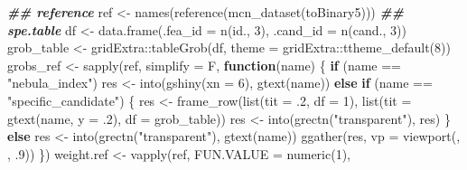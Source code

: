\documentclass[
]{article}
\newenvironment{Shaded}{\begin{snugshade}}{\end{snugshade}}
\newcommand{\AttributeTok}[1]{\textcolor[rgb]{0.77,0.63,0.00}{#1}}
\newcommand{\ControlFlowTok}[1]{\textcolor[rgb]{0.13,0.29,0.53}{\textbf{#1}}}
\newcommand{\DecValTok}[1]{\textcolor[rgb]{0.00,0.00,0.81}{#1}}
\newcommand{\DocumentationTok}[1]{\textcolor[rgb]{0.56,0.35,0.01}{\textbf{\textit{#1}}}}
\newcommand{\FunctionTok}[1]{\textcolor[rgb]{0.00,0.00,0.00}{#1}}
\newcommand{\NormalTok}[1]{#1}
\newcommand{\OtherTok}[1]{\textcolor[rgb]{0.56,0.35,0.01}{#1}}
\newcommand{\SpecialCharTok}[1]{\textcolor[rgb]{0.00,0.00,0.00}{#1}}
\newcommand{\StringTok}[1]{\textcolor[rgb]{0.31,0.60,0.02}{#1}}
\begin{document}
\begin{Shaded}
\begin{Highlighting}[]
\DocumentationTok{\#\# reference}
\NormalTok{ref }\OtherTok{\textless{}{-}} \FunctionTok{names}\NormalTok{(}\FunctionTok{reference}\NormalTok{(}\FunctionTok{mcn\_dataset}\NormalTok{(toBinary5)))}
\DocumentationTok{\#\# spe.table}
\NormalTok{df }\OtherTok{\textless{}{-}} \FunctionTok{data.frame}\NormalTok{(}\AttributeTok{.fea\_id =} \FunctionTok{n}\NormalTok{(id., }\DecValTok{3}\NormalTok{), }\AttributeTok{.cand\_id =} \FunctionTok{n}\NormalTok{(cand., }\DecValTok{3}\NormalTok{))}
\NormalTok{grob\_table }\OtherTok{\textless{}{-}}\NormalTok{ gridExtra}\SpecialCharTok{::}\FunctionTok{tableGrob}\NormalTok{(df, }\AttributeTok{theme =}\NormalTok{ gridExtra}\SpecialCharTok{::}\FunctionTok{ttheme\_default}\NormalTok{(}\DecValTok{8}\NormalTok{))}
\NormalTok{grobs\_ref }\OtherTok{\textless{}{-}} \FunctionTok{sapply}\NormalTok{(ref, }\AttributeTok{simplify =}\NormalTok{ F,}
                    \ControlFlowTok{function}\NormalTok{(name) \{}
                      \ControlFlowTok{if}\NormalTok{ (name }\SpecialCharTok{==} \StringTok{"nebula\_index"}\NormalTok{)}
\NormalTok{                        res }\OtherTok{\textless{}{-}} \FunctionTok{into}\NormalTok{(}\FunctionTok{gshiny}\NormalTok{(}\AttributeTok{xn =} \DecValTok{6}\NormalTok{), }\FunctionTok{gtext}\NormalTok{(name))}
                      \ControlFlowTok{else} \ControlFlowTok{if}\NormalTok{ (name }\SpecialCharTok{==} \StringTok{"specific\_candidate"}\NormalTok{) \{}
\NormalTok{                        res }\OtherTok{\textless{}{-}} \FunctionTok{frame\_row}\NormalTok{(}\FunctionTok{list}\NormalTok{(}\AttributeTok{tit =}\NormalTok{ .}\DecValTok{2}\NormalTok{, }\AttributeTok{df =} \DecValTok{1}\NormalTok{),}
                                         \FunctionTok{list}\NormalTok{(}\AttributeTok{tit =} \FunctionTok{gtext}\NormalTok{(name, }\AttributeTok{y =}\NormalTok{ .}\DecValTok{2}\NormalTok{), }\AttributeTok{df =}\NormalTok{ grob\_table))}
\NormalTok{                        res }\OtherTok{\textless{}{-}} \FunctionTok{into}\NormalTok{(}\FunctionTok{grectn}\NormalTok{(}\StringTok{"transparent"}\NormalTok{), res)}
\NormalTok{                      \} }\ControlFlowTok{else}
\NormalTok{                        res }\OtherTok{\textless{}{-}} \FunctionTok{into}\NormalTok{(}\FunctionTok{grectn}\NormalTok{(}\StringTok{"transparent"}\NormalTok{), }\FunctionTok{gtext}\NormalTok{(name))}
                      \FunctionTok{ggather}\NormalTok{(res, }\AttributeTok{vp =} \FunctionTok{viewport}\NormalTok{(, , .}\DecValTok{9}\NormalTok{))}
\NormalTok{                    \})}
\NormalTok{weight.ref }\OtherTok{\textless{}{-}} \FunctionTok{vapply}\NormalTok{(ref, }\AttributeTok{FUN.VALUE =} \FunctionTok{numeric}\NormalTok{(}\DecValTok{1}\NormalTok{),}

\end{Highlighting}
\end{Shaded}
\end{document}
